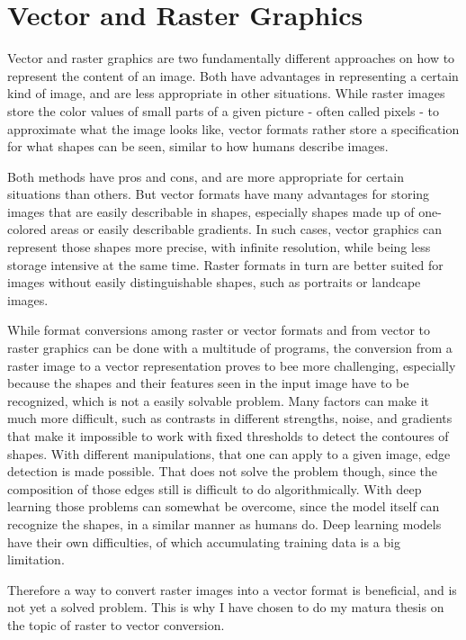 \documentclass[12pt, a4paper, titlepage]{report}
\begin{document}
\section{Vector and Raster Graphics}

Vector and raster graphics are two fundamentally different approaches on how to represent the content of an image. Both have advantages in representing a certain kind of image, and are less appropriate in other situations. While raster images store the color values of small parts of a given picture - often called pixels - to approximate what the image looks like, vector formats rather store a specification for what shapes can be seen, similar to how humans describe images.

Both methods have pros and cons, and are more appropriate for certain situations than others. But vector formats have many advantages for storing images that are easily describable in shapes, especially shapes made up of one-colored areas or easily describable gradients. In such cases, vector graphics can represent those shapes more precise, with infinite resolution, while being less storage intensive at the same time. Raster formats in turn are better suited for images without easily distinguishable shapes, such as portraits or landcape images.

While format conversions among raster or vector formats and from vector to raster graphics can be done with a multitude of programs, the conversion from a raster image to a vector representation proves to bee more challenging, especially because the shapes and their features seen in the input image have to be recognized, which is not a easily solvable problem. Many factors can make it much more difficult, such as contrasts in different strengths, noise, and gradients that make it impossible to work with fixed thresholds to detect the contoures of shapes. With different manipulations, that one can apply to a given image, edge detection is made possible. That does not solve the problem though, since the composition of those edges still is difficult to do algorithmically.
With deep learning those problems can somewhat be overcome, since the model itself can recognize the shapes, in a similar manner as humans do. Deep learning models have their own difficulties, of which accumulating training data is a big limitation.

Therefore a way to convert raster images into a vector format is beneficial, and is not yet a solved problem. This is why I have chosen to do my matura thesis on the topic of raster to vector conversion.
\end{document}
